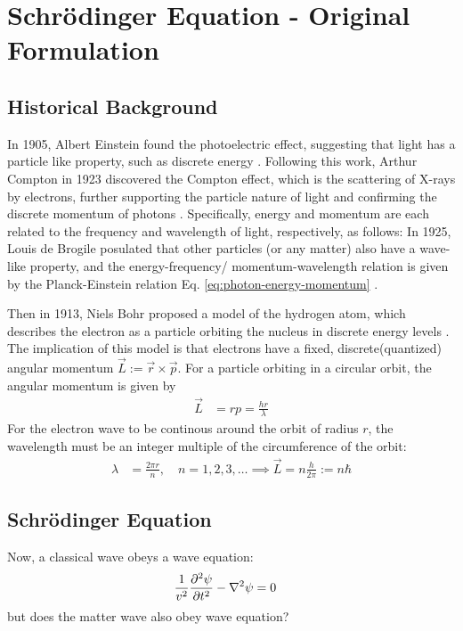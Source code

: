 \section{Schrödinger Equation - Original Formulation}
\subsection{Historical Background}
In 1905, Albert Einstein found the photoelectric effect, suggesting that light has a particle like property, such as discrete energy
\cite{1905-photoelectric}.
Following this work, Arthur Compton in 1923 discovered the Compton effect, which is the scattering of X-rays by electrons, further supporting the particle nature of light and confirming the discrete momentum of photons
\cite{1923-compton}.
Specifically, energy and momentum are each related to the frequency and wavelength of light, respectively, as follows:
In 1925, Louis de Brogile posulated that other particles (or any matter) also have a wave-like property, and the energy-frequency/ momentum-wavelength relation is given by the Planck-Einstein relation Eq. \eqref{eq:photon-energy-momentum} \cite{1925-deBroglie}.

Then in 1913, Niels Bohr proposed a model of the hydrogen atom, which describes the electron as a particle orbiting the nucleus in discrete energy levels \cite{1913-bohr}.
The implication of this model is that electrons have a fixed, discrete(quantized) angular momentum $\vec{L} := \vec{r} \times \vec{p}$.
For a particle orbiting in a circular orbit, the angular momentum is given by
\begin{align}
  \vec{L} & = r p = \frac{h r}{\lambda}
\end{align}
For the electron wave to be continous around the orbit of radius $r$, the wavelength must be an integer multiple of the circumference of the orbit:
\begin{align}
  \lambda & = \frac{2 \pi r}{n}, \quad n = 1, 2, 3, \ldots \implies \vec{L} = n \frac{h}{2 \pi} := n \hbar
\end{align}

\subsection{Schrödinger Equation}
Now, a classical wave obeys a wave equation:
\begin{align}
  \frac{1}{v^2} \pdv[2]{\psi}{t} - \nabla^2 \psi & = 0
\end{align}
but does the matter wave also obey wave equation?

